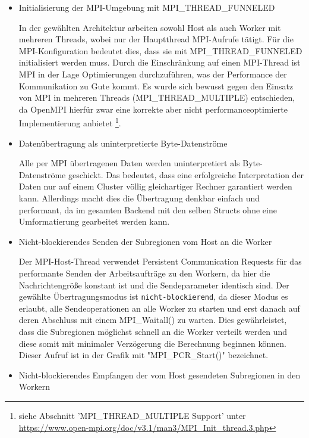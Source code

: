 \begin{itemize}

	\item \label{item:mpi_init} Initialisierung der MPI-Umgebung mit MPI\_THREAD\_FUNNELED

	      In der gewählten Architektur arbeiten sowohl Host als auch Worker mit mehreren Threads, wobei nur der Hauptthread MPI-Aufrufe tätigt. Für die MPI-Konfiguration bedeutet dies, dass sie mit MPI\_THREAD\_FUNNELED initialisiert werden muss. Durch die Einschränkung auf einen MPI-Thread ist MPI in der Lage Optimierungen durchzuführen, was der Performance der Kommunikation zu Gute kommt. Es wurde sich bewusst gegen den Einsatz von MPI in mehreren Threads (MPI\_THREAD\_MULTIPLE) entschieden, da OpenMPI hierfür zwar eine korrekte aber nicht performanceoptimierte Implementierung anbietet \footnote{siehe Abschnitt 'MPI\_THREAD\_MULTIPLE Support' unter \url{https://www.open-mpi.org/doc/v3.1/man3/MPI_Init_thread.3.php}}.

	\item Datenübertragung als uninterpretierte Byte-Datenströme

	      Alle per MPI übertragenen Daten werden uninterpretiert als Byte-Datenströme geschickt. Das bedeutet, dass eine erfolgreiche Interpretation der Daten nur auf einem Cluster völlig gleichartiger Rechner garantiert werden kann. Allerdings macht dies die Übertragung denkbar einfach und performant, da im gesamten Backend mit den selben Structs ohne eine Umformatierung gearbeitet werden kann.

	\item Nicht-blockierendes Senden der Subregionen vom Host an die Worker

	      Der MPI-Host-Thread verwendet Persistent Communication Requests für das performante Senden der Arbeitsaufträge zu den Workern, da hier die Nachrichtengröße konstant ist und die Sendeparameter identisch sind. Der gewählte Übertragungsmodus ist \verb|nicht-blockierend|, da dieser Modus es erlaubt, alle Sendeoperationen an alle Worker zu starten und erst danach auf deren Abschluss mit einem MPI\_Waitall() zu warten. Dies gewährleistet, dass die Subregionen möglichst schnell an die Worker verteilt werden und diese somit mit minimaler Verzögerung die Berechnung beginnen können. Dieser Aufruf ist in der Grafik mit "MPI\_PCR\_Start()" bezeichnet.

	\item Nicht-blockierendes Empfangen der vom Host gesendeten Subregionen in den Workern


\end{itemize}

